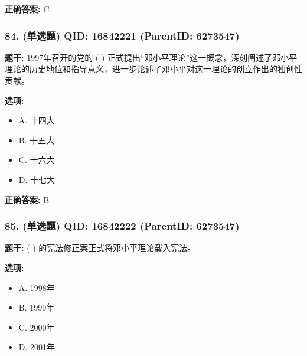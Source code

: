 \documentclass[12pt,UTF8]{ctexart}
\begin{document}
\textbf{正确答案:}
C

\vspace{0.3em}\hrulefill\vspace{0.7em}

\subsubsection*{84. (单选题) \small QID: 16842221 (ParentID: 6273547)}

\textbf{题干:}
1997年召开的党的 ( ) 正式提出“邓小平理论”这一概念，深刻阐述了邓小平理论的历史地位和指导意义，进一步论述了邓小平对这一理论的创立作出的独创性贡献。



\textbf{选项:}
\begin{itemize}[leftmargin=*]

  \item A. 十四大

  \item B. 十五大

  \item C. 十六大

  \item D. 十七大

\end{itemize}

\textbf{正确答案:}
B

\vspace{0.3em}\hrulefill\vspace{0.7em}

\subsubsection*{85. (单选题) \small QID: 16842222 (ParentID: 6273547)}

\textbf{题干:}
( ) 的宪法修正案正式将邓小平理论载入宪法。



\textbf{选项:}
\begin{itemize}[leftmargin=*]

  \item A. 1998年

  \item B. 1999年

  \item C. 2000年

  \item D. 2001年

\end{itemize}
\end{document}
